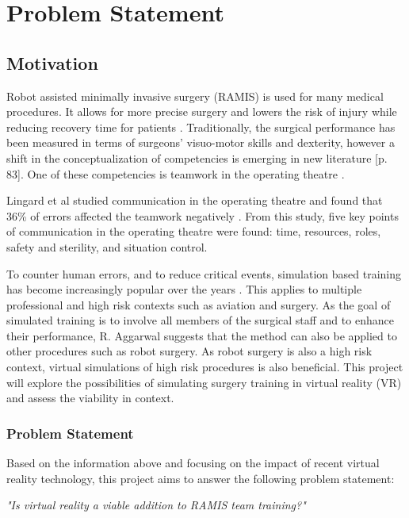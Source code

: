 \chapter{Problem Statement}

\section{Motivation}

Robot assisted minimally invasive surgery (RAMIS) is used for many medical procedures. It allows for more precise surgery and lowers the risk of injury while reducing recovery time for patients \citep{radojcic_[history_2009}. Traditionally, the surgical performance has been measured in terms of surgeons' visuo-motor skills and dexterity, however a shift in the conceptualization of competencies is emerging in new literature \citep{flin_safer_2009}[p. 83]. One of these competencies is teamwork in the operating theatre \citep{salas_does_2008}. 

Lingard et al studied communication in the operating theatre and found that 36\% of errors affected the teamwork negatively \citep{lingard_communication_2004}. From this study, five key points of communication in the operating theatre were found: time, resources, roles, safety and sterility, and situation control.


To counter human errors, and to reduce critical events, simulation based training has become increasingly popular over the years \citep{aggarwal_simulated_2004}. This applies to multiple professional and high risk contexts such as aviation and surgery. As the goal of simulated training is to involve all members of the surgical staff and to enhance their performance, R. Aggarwal suggests that the method can also be applied to other procedures such as robot surgery. As robot surgery is also a high risk context, virtual simulations of high risk procedures is also beneficial. 
This project will explore the possibilities of simulating surgery training in virtual reality (VR) and assess the viability in context. 



\subsection{Problem Statement}

Based on the information above and focusing on the impact of recent virtual reality technology, this project aims to answer the following problem statement:\\

\begin{center}
\emph{\textit{"Is virtual reality a viable addition to RAMIS team training?"}}
\end{center}



